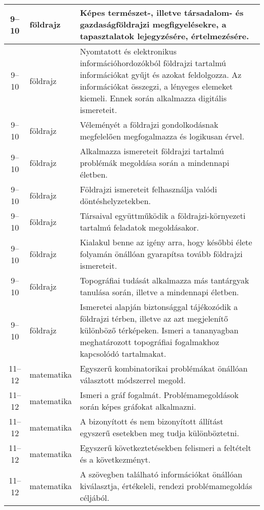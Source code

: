\begin{small}
\begin{longtable}{c | p{2cm} |  p{11cm} }
              9--10 & földrajz & Képes természet-, illetve társadalom- és gazdaságföldrajzi megfigyelésekre, a tapasztalatok lejegyzésére, értelmezésére. \\ \hline
              9--10 & földrajz & Nyomtatott és elektronikus információhordozókból földrajzi tartalmú információkat gyűjt és azokat feldolgozza. Az információkat összegzi, a lényeges elemeket kiemeli. Ennek során alkalmazza digitális ismereteit. \\ \hline
              9--10 & földrajz & Véleményét a földrajzi gondolkodásnak megfelelően megfogalmazza és logikusan érvel. \\ \hline
              9--10 & földrajz & Alkalmazza ismereteit földrajzi tartalmú problémák megoldása során a mindennapi életben. \\ \hline
              9--10 & földrajz & Földrajzi ismereteit felhasználja valódi döntéshelyzetekben. \\ \hline
              9--10 & földrajz & Társaival együttműködik a földrajzi-környezeti tartalmú feladatok megoldásakor. \\ \hline
              9--10 & földrajz & Kialakul benne az igény arra, hogy későbbi élete folyamán önállóan gyarapítsa tovább földrajzi ismereteit. \\ \hline
              9--10 & földrajz & Topográfiai tudását alkalmazza más tantárgyak tanulása során, illetve a mindennapi életben. \\ \hline
              9--10 & földrajz & Ismeretei alapján biztonsággal tájékozódik a földrajzi térben, illetve az azt megjelenítő különböző térképeken. Ismeri a tananyagban meghatározott topográfiai fogalmakhoz kapcsolódó tartalmakat. \\ \hline
              11--12 & matematika & Egyszerű kombinatorikai problémákat önállóan választott módszerrel megold. \\ \hline
              11--12 & matematika & Ismeri a gráf fogalmát. Problémamegoldások során képes gráfokat alkalmazni. \\ \hline
              11--12 & matematika & A bizonyított és nem bizonyított állítást egyszerű esetekben meg tudja különböztetni. \\ \hline
              11--12 & matematika & Egyszerű következtetésekben felismeri a feltételt és a következményt. \\ \hline
              11--12 & matematika & A szövegben található információkat önállóan kiválasztja, értékeleli, rendezi problémamegoldás céljából. \\ \hline

\end{longtable}
\end{small}

